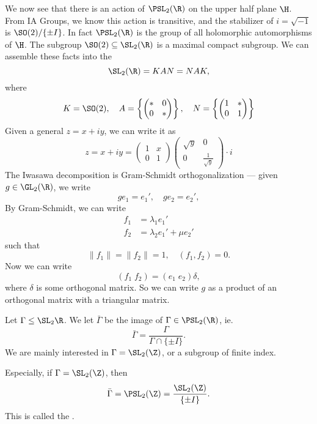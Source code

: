 \documentclass[a4paper]{article}
\begin{document}
We now see that there is an action of $\PSL_2(\R)$ on the upper half plane $\H$. From IA Groups, we know this action is transitive, and the stabilizer of $i = \sqrt{-1}$ is $\SO(2)/\{\pm I\}$. In fact $\PSL_2(\R)$ is the group of all holomorphic automorphisms of $\H$. The subgroup $\SO(2) \subseteq \SL_2(\R)$ is a maximal compact subgroup. We can assemble these facts into the 
\[
  \SL_2(\R) = KAN = NAK,
\]
where
\[
  K = \SO(2), \quad A = \left\{
    \begin{pmatrix}
      * & 0\\
      0 & *
    \end{pmatrix}
  \right\},
  \quad N = \left\{
    \begin{pmatrix}
      1 & *\\
      0 & 1
    \end{pmatrix}
  \right\}
\]
Given a general $z = x + iy$, we can write it as
\[
  z = x + iy =
  \begin{pmatrix}
    1 & x\\
    0 & 1
  \end{pmatrix}
  \begin{pmatrix}
    \sqrt{y} & 0\\
    0 & \frac{1}{\sqrt{y}}
  \end{pmatrix}
  \cdot i
\]
The Iwasawa decomposition is Gram-Schmidt orthogonalization --- given $g \in \GL_2(\R)$, we write
\[
  g e_1 = e_1',\quad g e_2 = e_2',
\]
By Gram-Schmidt, we can write
\begin{align*}
  f_1 &= \lambda_1 e_1'\\
  f_2 &= \lambda_2 e_1' + \mu e_2'
\end{align*}
such that
\[
  \|f_1\| = \|f_2\| = 1,\quad (f_1, f_2) = 0.
\]
Now we can write
\[
  (f_1\; f_2) = (e_1\; e_2) \delta,
\]
where $\delta$ is some orthogonal matrix. So we can write $g$ as a product of an orthogonal matrix with a triangular matrix.

Let $\Gamma \leq \SL_2\R$. We let $\bar\Gamma$ be the image of $\Gamma \in \PSL_2(\R)$, ie.
\[
  \bar\Gamma = \frac{\Gamma}{\Gamma \cap \{\pm I\}}.
\]
We are mainly interested in $\Gamma = \SL_2(\Z)$, or a subgroup of finite index.

Especially, if $\Gamma = \SL_2(\Z)$, then
\[
  \bar{\Gamma} = \PSL_2(\Z) = \frac{\SL_2(\Z)}{\{\pm I\}}.
\]
This is called the .
\end{document}
